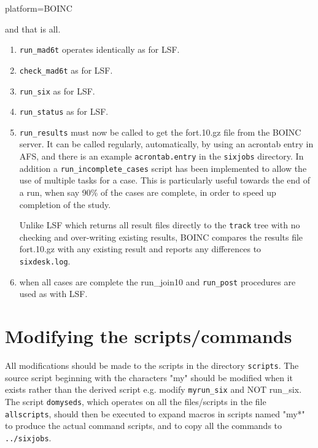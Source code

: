 \documentclass{cernatsnote}
\begin{document}
\begin{description}
\item[platform=BOINC]
\end{description}
and that is all.
\begin{enumerate}
\item {\tt run\_mad6t} operates identically as for LSF.
\item {\tt check\_mad6t} as for LSF.
\item {\tt run\_six} as for LSF. 
\item {\tt run\_status} as for LSF. 
\item {\tt run\_results} must now be called to get the fort.10.gz file from the
BOINC server. It can be called regularly, automatically, by using an acrontab
entry in AFS, and there is an example {\tt acrontab.entry} in the {\tt sixjobs}
directory. In addition a {\tt run\_incomplete\_cases} script has been
implemented to allow the use of multiple tasks for a case. This is particularly
useful towards the end of a run, when say 90\% of the cases are complete, in
order to speed up completion of the study.

Unlike LSF which returns all result files directly to the {\tt track} tree with
no checking and over-writing existing results, BOINC compares the results file
fort.10.gz with any existing result and reports any differences to {\tt
sixdesk.log}.
\item when all cases are complete the {run\_join10} and {\tt run\_post}
  procedures are used as with LSF.
\end{enumerate}

\section{Modifying the scripts/commands}

All modifications should be made to the scripts in the directory {\tt scripts}.
The source script beginning with the characters "my" should be modified when it
exists rather than the derived script e.g. modify {\tt myrun\_six} and NOT
{run\_six}. The script {\tt domyseds}, which operates on all the files/scripts
in the file {\tt allscripts}, should then be executed to expand macros in
scripts named "my*" to produce the actual command scripts, and to copy  all the
commands to {\tt ../sixjobs}.
\end{document}
